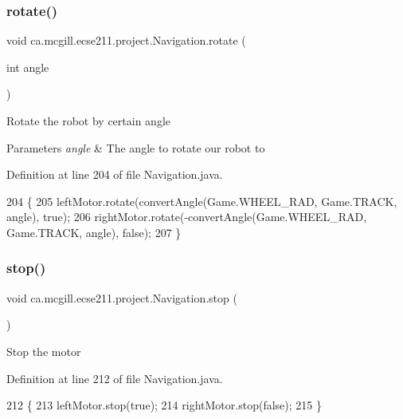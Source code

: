 \subsubsection{\texorpdfstring{rotate()}{rotate()}}
{\footnotesize\ttfamily void ca.\+mcgill.\+ecse211.\+project.\+Navigation.\+rotate (\begin{DoxyParamCaption}\item[{int}]{angle }\end{DoxyParamCaption})}

Rotate the robot by certain angle


\begin{DoxyParams}{Parameters}
{\em angle} & The angle to rotate our robot to \\
\hline
\end{DoxyParams}


Definition at line 204 of file Navigation.\+java.


\begin{DoxyCode}
204                                 \{
205     leftMotor.rotate(convertAngle(Game.WHEEL\_RAD, Game.TRACK, angle), \textcolor{keyword}{true});
206     rightMotor.rotate(-convertAngle(Game.WHEEL\_RAD, Game.TRACK, angle), \textcolor{keyword}{false});
207   \}
\end{DoxyCode}
\mbox{\label{classca_1_1mcgill_1_1ecse211_1_1project_1_1_navigation_ae8530d181ffd790ff9dea5eeab54b1a1}} 
\subsubsection{\texorpdfstring{stop()}{stop()}}
{\footnotesize\ttfamily void ca.\+mcgill.\+ecse211.\+project.\+Navigation.\+stop (\begin{DoxyParamCaption}{ }\end{DoxyParamCaption})}

Stop the motor 

Definition at line 212 of file Navigation.\+java.


\begin{DoxyCode}
212                      \{
213     leftMotor.stop(\textcolor{keyword}{true});
214     rightMotor.stop(\textcolor{keyword}{false});
215   \}
\end{DoxyCode}
\mbox{\label{classca_1_1mcgill_1_1ecse211_1_1project_1_1_navigation_ada8a324c1d391698164476d4d728f0c4}} 
